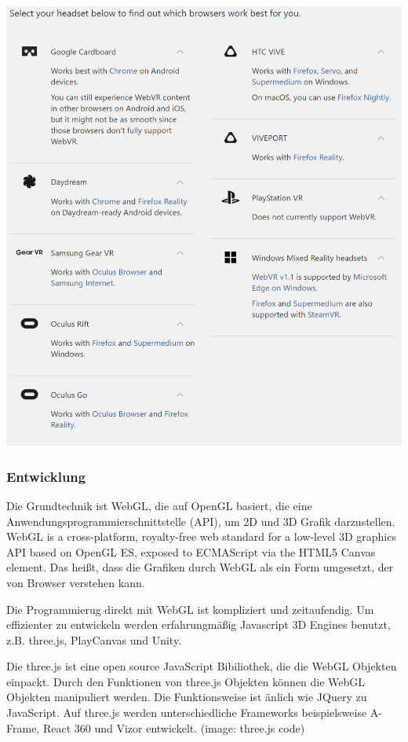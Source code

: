  \includegraphics[width=\textwidth]{images/supportedBrowsers.png}
 
  \subsubsection{Entwicklung}
 Die Grundtechnik ist WebGL, die auf OpenGL basiert, die eine Anwendungsprogrammierschnittstelle (API), um 2D und 3D Grafik darzustellen. \glqq WebGL is a cross-platform, royalty-free web standard for a low-level 3D graphics API based on OpenGL ES, exposed to ECMAScript via the HTML5 Canvas element. \grqq \citep{23} Das heißt, dass die Grafiken durch WebGL als ein Form umgesetzt, der von Browser verstehen kann. 
 
 Die Programmierug direkt mit WebGL ist kompliziert und zeitaufendig. Um effizienter zu entwickeln werden erfahrungmäßig Javascript 3D Engines benutzt, z.B. three.js, PlayCanvas und Unity.
 
 Die three.js ist eine open source JavaScript Bibiliothek, die die WebGL Objekten einpackt. Durch den Funktionen von three.js Objekten können die WebGL Objekten manipuliert werden. Die Funktionsweise ist änlich wie JQuery zu JavaScript. Auf three.js werden unterschiedliche Frameworks beispielsweise A-Frame, React 360 und Vizor entwickelt.
 (image: three.js code)
 
